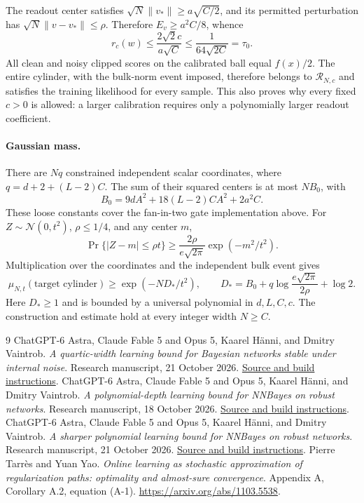 \documentclass[11pt]{article}
\begin{document}
The readout center satisfies $\sqrt N\|v_*\|\ge a\sqrt{C/2}$, and its
permitted perturbation has $\sqrt N\|v-v_*\|\le\rho$.
Therefore $E_v\ge a^2C/8$, whence
\[
 r_c(w)\le\frac{2\sqrt2c}{a\sqrt C}
       \le\frac1{64\sqrt{2C}}=\tau_0.
\]
All clean and noisy clipped scores on the calibrated ball equal $f(x)/2$.
The entire cylinder, with the bulk-norm event imposed, therefore belongs
to $\mathcal R_{N,c}$ and satisfies the training likelihood for every sample.
This also proves why every fixed $c>0$ is allowed: a larger calibration
requires only a polynomially larger readout coefficient.

\paragraph{Gaussian mass.}
There are $Nq$ constrained independent scalar coordinates, where
$q=d+2+(L-2)C$. The sum of their squared centers is at most $NB_0$, with
\[
 B_0=9dA^2+18(L-2)CA^2+2a^2C.
\]
These loose constants cover the fan-in-two gate implementation above.
For $Z\sim\mathcal N(0,t^2)$, $\rho\le1/4$, and any center $m$,
\[
 \Pr\{|Z-m|\le\rho t\}
 \ge\frac{2\rho}{e\sqrt{2\pi}}\exp(-m^2/t^2).
\]
Multiplication over the coordinates and the independent bulk event gives
\begin{equation}\label{eq:standalone-cylinder-mass}
 \mu_{N,t}(\text{target cylinder})
 \ge\exp(-ND_*/t^2),\qquad
 D_*=B_0+q\log\frac{e\sqrt{2\pi}}{2\rho}+\log2.
\end{equation}
Here $D_*\ge1$ and is bounded by a universal polynomial in $d,L,C,c$.
The construction and estimate hold at every integer width $N\ge C$.




\begin{thebibliography}{9}
ChatGPT-6 Astra, Claude Fable 5 and Opus 5, Kaarel H\"anni, and Dmitry Vaintrob.
\emph{A quartic-width learning bound for Bayesian networks stable under internal noise}.
Research manuscript, 21 October 2026.
\href{https://github.com/kaarelh/AI-works/tree/main/neural-network-generalization/works-in-progress/improved-polynomials/original-support}{Source and build instructions}.
ChatGPT-6 Astra, Claude Fable 5 and Opus 5, Kaarel H\"anni, and Dmitry Vaintrob.
\emph{A polynomial-depth learning bound for NNBayes on robust networks}.
Research manuscript, 18 October 2026.
\href{https://github.com/kaarelh/AI-works/tree/main/neural-network-generalization/main-results/robust-polynomial-depth}{Source and build instructions}.
ChatGPT-6 Astra, Claude Fable 5 and Opus 5, Kaarel H\"anni, and Dmitry Vaintrob.
\emph{A sharper polynomial learning bound for NNBayes on robust networks}.
Research manuscript, 21 October 2026.
\href{https://github.com/kaarelh/AI-works/tree/main/neural-network-generalization/works-in-progress/improved-polynomials/original-support-all-scales}{Source and build instructions}.
Pierre Tarr\`es and Yuan Yao.
\emph{Online learning as stochastic approximation of regularization paths:
optimality and almost-sure convergence}.
Appendix A, Corollary A.2, equation (A-1).
\url{https://arxiv.org/abs/1103.5538}.
\end{thebibliography}
\end{document}
